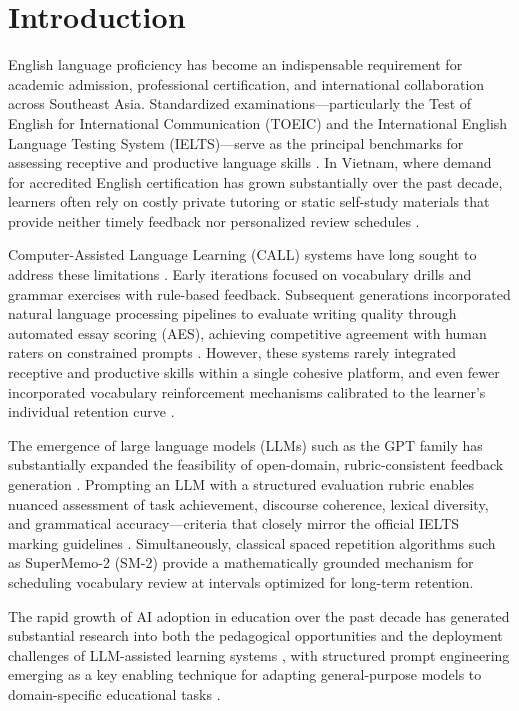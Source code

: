 \documentclass[conference]{IEEEtran}
\begin{document}
\section{Introduction}

English language proficiency has become an indispensable requirement for academic admission, professional certification, and international collaboration across Southeast Asia. Standardized examinations—particularly the Test of English for International Communication (TOEIC) and the International English Language Testing System (IELTS)—serve as the principal benchmarks for assessing receptive and productive language skills \cite{b4}. In Vietnam, where demand for accredited English certification has grown substantially over the past decade, learners often rely on costly private tutoring or static self-study materials that provide neither timely feedback nor personalized review schedules \cite{b4}.

Computer-Assisted Language Learning (CALL) systems have long sought to address these limitations \cite{b3}. Early iterations focused on vocabulary drills and grammar exercises with rule-based feedback. Subsequent generations incorporated natural language processing pipelines to evaluate writing quality through automated essay scoring (AES), achieving competitive agreement with human raters on constrained prompts \cite{b12}. However, these systems rarely integrated receptive and productive skills within a single cohesive platform, and even fewer incorporated vocabulary reinforcement mechanisms calibrated to the learner's individual retention curve \cite{b4}.

The emergence of large language models (LLMs) such as the GPT family has substantially expanded the feasibility of open-domain, rubric-consistent feedback generation \cite{b10}. Prompting an LLM with a structured evaluation rubric enables nuanced assessment of task achievement, discourse coherence, lexical diversity, and grammatical accuracy—criteria that closely mirror the official IELTS marking guidelines \cite{b11}. Simultaneously, classical spaced repetition algorithms such as SuperMemo-2 (SM-2) \cite{b8} provide a mathematically grounded mechanism for scheduling vocabulary review at intervals optimized for long-term retention.

The rapid growth of AI adoption in education over the past decade \cite{b4} has generated substantial research into both the pedagogical opportunities and the deployment challenges of LLM-assisted learning systems \cite{b5}, with structured prompt engineering emerging as a key enabling technique for adapting general-purpose models to domain-specific educational tasks \cite{b7}.
\end{document}
